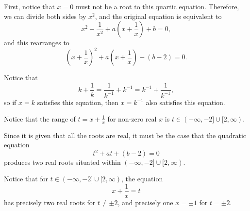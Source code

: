 \Question{\currfilebase}

First, notice that \(x = 0\) must not be a root to this quartic equation. Therefore, we can divide both sides by \(x^2\), and the original equation is equivalent to
\[
    x^2 + \frac{1}{x^2} + a \left(x + \frac{1}{x}\right) + b = 0,
\]
and this rearranges to
\[
    \left(x + \frac{1}{x}\right)^2 + a \left(x + \frac{1}{x}\right) + (b - 2) = 0.
\]

Notice that
\[
    k + \frac{1}{k} = \frac{1}{k^{-1}} + k^{-1} = k^{-1} + \frac{1}{k^{-1}},
\]
so if \(x = k\) satisfies this equation, then \(x = k^{-1}\) also satisfies this equation.

Notice that the range of \(t = x + \frac{1}{x}\) for non-zero real \(x\) is \(t \in (-\infty, -2] \cup [2, \infty)\).

Since it is given that all the roots are real, it must be the case that the quadratic equation
\[
    t^2 + at + (b - 2) = 0
\]
produces two real roots situated within \((-\infty, -2] \cup [2, \infty)\).

    Notice that for \(t \in (-\infty, -2] \cup [2, \infty)\), the equation
\[
    x + \frac{1}{x} = t
\]
has precisely two real roots for \(t \neq \pm 2\), and precisely one \(x = \pm 1\) for \(t = \pm 2\).

